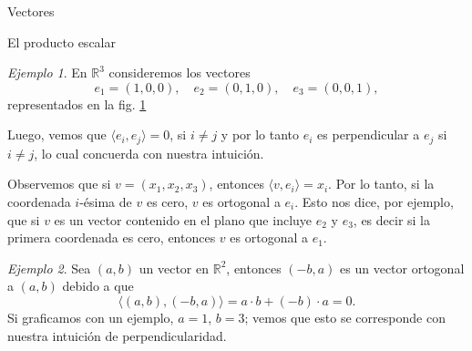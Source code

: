 \documentclass[a4paper,12pt,twoside,spanish,reqno]{amsbook}
\numberwithin{equation}{section}
\theoremstyle{definition}
\theoremstyle{remark}
\newtheorem*{ejemplo*}{Ejemplo}
\newcommand{\R}{\mathbb R}
\begin{document}
\begin{chapter}{Vectores}
\begin{section}{El producto escalar}
        \begin{ejemplo*}
            En  $\R^3$ consideremos los vectores
            \begin{equation*}
            e_1 = (1,0,0),\quad e_2 = (0, 1,0),\quad e_3 = (0,0,1),
            \end{equation*}
            representados en la fig. \ref{fig-canonicos-en-R3}
            \begin{figure}[h]
                \caption{}
                \label{fig-canonicos-en-R3}
            \end{figure}
            
            Luego, vemos que $\langle e_i , e_j \rangle = 0$, si $i \ne j$ y por lo tanto $e_i$  es perpendicular a $e_j$ si $i \ne j$, lo cual concuerda con nuestra intuición. 
        \end{ejemplo*} 
            
            Observemos que si $v = (x_1,x_2,x_3)$,  entonces $\langle v , e_i \rangle = x_i$. Por lo tanto,  si la coordenada $i$-ésima de $v$ es cero,  $v$  es ortogonal a $e_i$. Esto nos dice,  por ejemplo,  que si $v$  es un vector contenido en el plano que incluye $e_2$ y $e_3$,  es decir si la primera coordenada es cero,  entonces $v$  es ortogonal a $e_1$. 
            
        
        \begin{ejemplo*} Sea $(a,b)$ un vector en $\R^2$, entonces $(-b,a)$ es un vector ortogonal a $(a,b)$ debido a que
            \begin{equation*}
                \langle (a,b) , (-b,a) \rangle = a\cdot b + (-b) \cdot a = 0.
            \end{equation*}
            Si graficamos con un ejemplo, $a=1$, $b=3$; vemos que esto se corresponde con nuestra intuición de perpendicularidad. 
                

\end{ejemplo*}
\end{section}
\end{chapter}
\end{document}
